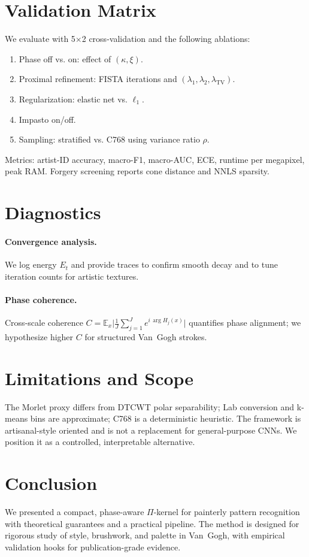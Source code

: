 \documentclass[11pt]{article}
\newcommand{\E}{\mathbb{E}}
\begin{document}
\section{Validation Matrix}
We evaluate with 5$\times$2 cross-validation and the following ablations:
\begin{enumerate}[label=\textbf{A\arabic*}]
  \item Phase off vs. on: effect of $(\kappa,\xi)$.
  \item Proximal refinement: FISTA iterations and $(\lambda_1,\lambda_2,\lambda_{\mathrm{TV}})$.
  \item Regularization: elastic net vs. $\ell_1$.
  \item Impasto on/off.
  \item Sampling: stratified vs. C768 using variance ratio $\rho$.
\end{enumerate}
Metrics: artist-ID accuracy, macro-F1, macro-AUC, ECE, runtime per megapixel, peak RAM. Forgery screening reports cone distance and NNLS sparsity.

\section{Diagnostics}
\paragraph{Convergence analysis.} We log energy $E_t$ and provide traces to confirm smooth decay and to tune iteration counts for artistic textures.

\paragraph{Phase coherence.} Cross-scale coherence
$C=\E_x\bigl|\tfrac{1}{J}\sum_{j=1}^J e^{i\,\arg H_j(x)}\bigr|$ quantifies phase alignment; we hypothesize higher $C$ for structured Van~Gogh strokes.

\section{Limitations and Scope}
The Morlet proxy differs from DTCWT polar separability; Lab conversion and k-means bins are approximate; C768 is a deterministic heuristic. The framework is artisanal-style oriented and is not a replacement for general-purpose CNNs. We position it as a controlled, interpretable alternative.

\section{Conclusion}
We presented a compact, phase-aware $\Pi$-kernel for painterly pattern recognition with theoretical guarantees and a practical pipeline. The method is designed for rigorous study of style, brushwork, and palette in Van~Gogh, with empirical validation hooks for publication-grade evidence.
\end{document}
